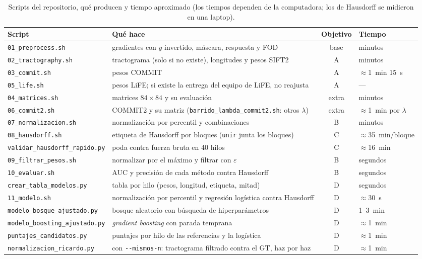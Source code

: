 \documentclass[11pt,a4paper]{article}
\newcommand{\code}[1]{\texttt{\small #1}}
\newcommand{\eps}{\varepsilon}
\begin{document}
\begin{table}[H]
\centering
\footnotesize
\renewcommand{\code}[1]{\texttt{#1}}%
\begin{tabularx}{\textwidth}{@{}l>{\raggedright\arraybackslash}Xcl@{}}
\toprule
\textbf{Script} & \textbf{Qu\'e hace} & \textbf{Objetivo} & \textbf{Tiempo}\\
\midrule
\code{01\_preprocess.sh}    & gradientes con $y$ invertido, m\'ascara, respuesta y FOD & base & minutos\\
\code{02\_tractography.sh}  & tractograma (solo si no existe), longitudes y pesos SIFT2 & A & minutos\\
\code{03\_commit.sh}        & pesos COMMIT & A & $\approx$1~min 15~s\\
\code{05\_life.sh}          & pesos LiFE; si existe la entrega del equipo de LiFE, no reajusta & A & ---\\
\code{04\_matrices.sh}      & matrices $84\times84$ y su evaluaci\'on & extra & minutos\\
\code{06\_commit2.sh}       & COMMIT2 y su matriz (\code{barrido\_lambda\_commit2.sh}: otros $\lambda$) & extra & $\approx$1~min por $\lambda$\\
\code{07\_normalizacion.sh} & normalizaci\'on por percentil y combinaciones & B & minutos\\
\code{08\_hausdorff.sh}     & etiqueta de Hausdorff por bloques (\code{unir} junta los bloques) & C & $\approx$35~min/bloque\\
\code{validar\_hausdorff\_rapido.py} & poda contra fuerza bruta en 40 hilos & C & $\approx$16~min\\
\code{09\_filtrar\_pesos.sh}& normalizar por el m\'aximo y filtrar con $\eps$ & B & segundos\\
\code{10\_evaluar.sh}       & AUC y precisi\'on de cada m\'etodo contra Hausdorff & B & segundos\\
\code{crear\_tabla\_modelos.py} & tabla por hilo (pesos, longitud, etiqueta, mitad) & D & segundos\\
\code{11\_modelo.sh}        & normalizaci\'on por percentil y regresi\'on log\'istica contra Hausdorff & D & $\approx$30~s\\
\code{modelo\_bosque\_ajustado.py} & bosque aleatorio con b\'usqueda de hiperpar\'ametros & D & 1--3~min\\
\code{modelo\_boosting\_ajustado.py} & \textit{gradient boosting} con parada temprana & D & $\approx$1~min\\
\code{puntajes\_candidatos.py} & puntajes por hilo de las referencias y la log\'istica & D & $\approx$1~min\\
\code{normalizacion\_ricardo.py} & con \code{-{}-mismos-n}: tractograma filtrado contra el GT, haz por haz & D & $\approx$1~min\\
\bottomrule
\end{tabularx}
\caption{Scripts del repositorio, qu\'e producen y tiempo aproximado (los tiempos dependen
de la computadora; los de Hausdorff se midieron en una laptop).}
\label{tab:scripts}
\end{table}
\end{document}
